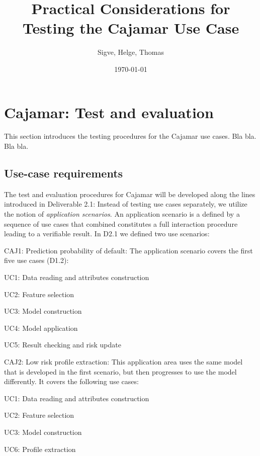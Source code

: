 \documentclass{article}
\title{Practical Considerations for Testing the Cajamar Use Case}
\author{Sigve, Helge, Thomas}
\date{\today}
\theoremstyle{theorem}
\theoremstyle{definition}
\begin{document}
\maketitle


\section{Cajamar: Test and evaluation}

This section introduces the testing procedures for the Cajamar use cases. Bla bla. Bla bla. 

\subsection{Use-case requirements}

The test and evaluation procedures for Cajamar will be developed along the lines introduced in Deliverable 2.1: Instead of testing use cases separately, we utilize the notion of {\em application scenarios}. 
An application scenario is a defined by a sequence of use cases that combined constitutes a full interaction procedure leading to a verifiable result. In D2.1 we defined two use scenarios:

\bde
\item[CAJ1: Prediction probability of default:]
The application scenario covers the first five use cases (D1.2):
\bit 
\item UC1: Data reading and attributes construction
\item UC2: Feature selection
\item UC3: Model construction
\item UC4: Model application
\item UC5: Result checking and risk update
\eit

\item[CAJ2: Low risk profile extraction:] This application area uses the same model that is developed in the first scenario, but then progresses to use the model differently. It covers the following use cases:
\bit 
\item UC1: Data reading and attributes construction
\item UC2: Feature selection
\item UC3: Model construction
\item UC6: Profile extraction
\eit
\ede
\end{document}
